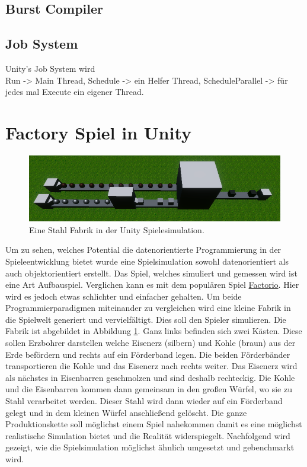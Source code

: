 \documentclass[12pt, titlepage]{article}
\begin{document}
\subsection{Burst Compiler}
\subsection{Job System}
Unity's Job System wird \\
Run -> Main Thread, Schedule -> ein Helfer Thread, ScheduleParallel -> für jedes mal Execute ein eigener Thread.
\newpage
\section{Factory Spiel in Unity}
\begin{figure}
\includegraphics[scale=0.87]{Bilder/Stahl Fabrik.png}
\caption{Eine Stahl Fabrik in der Unity Spielesimulation.}
\label{fig:steel}
\end{figure}
Um zu sehen, welches Potential die datenorientierte Programmierung in der Spieleentwicklung bietet wurde eine Spielsimulation sowohl datenorientiert als auch objektorientiert erstellt. Das Spiel, welches simuliert und gemessen wird ist eine Art Aufbauspiel. Verglichen kann es mit dem populären Spiel \href{https://www.factorio.com/}{Factorio}. Hier wird es jedoch etwas schlichter und einfacher gehalten. Um beide Programmierparadigmen miteinander zu vergleichen wird eine kleine Fabrik in die Spielwelt generiert und vervielfältigt. Dies soll den Spieler simulieren. Die Fabrik ist abgebildet in Abbildung \ref{fig:steel}. Ganz links befinden sich zwei Kästen. Diese sollen Erzbohrer darstellen welche Eisenerz (silbern) und Kohle (braun) aus der Erde befördern und rechts auf ein Förderband legen. Die beiden Förderbänder transportieren die Kohle und das Eisenerz nach rechts weiter. Das Eisenerz wird als nächstes in Eisenbarren geschmolzen und sind deshalb rechteckig. Die Kohle und die Eisenbarren kommen dann gemeinsam in den großen Würfel, wo sie zu Stahl verarbeitet werden. Dieser Stahl wird dann wieder auf ein Förderband gelegt und in dem kleinen Würfel anschließend gelöscht. Die ganze Produktionskette soll möglichst einem Spiel nahekommen damit es eine möglichst realistische Simulation bietet und die Realität widerspiegelt. Nachfolgend wird gezeigt, wie die Spielsimulation möglichst ähnlich umgesetzt und gebenchmarkt wird.
\end{document}
